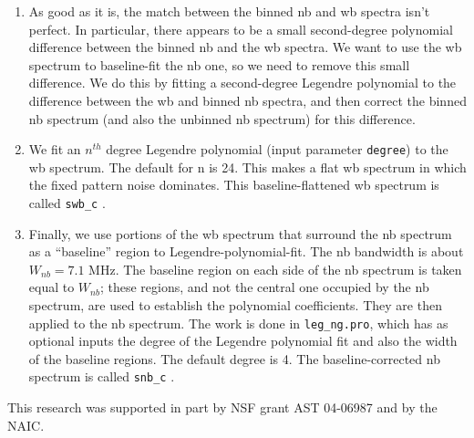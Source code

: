 \documentclass[psfig,preprint]{aastex}
\begin{document}
\begin{enumerate}
	\item As good as it is, the match between the binned nb and wb
spectra isn't perfect.  In particular, there appears to be a small
second-degree polynomial difference between the binned nb and the wb
spectra.  We want to use the wb spectrum to baseline-fit the nb one, so
we need to remove this small difference.  We do this by fitting a
second-degree Legendre polynomial to the difference between the wb and
binned nb spectra, and then correct the binned nb spectrum (and also the
unbinned nb spectrum) for this difference. 

	\item We fit an $n^{th}$ degree Legendre polynomial (input parameter
\verb$degree$) to the wb spectrum. The default for n is 24. This makes a
flat wb spectrum in which the fixed pattern noise dominates. This
baseline-flattened wb spectrum is called \verb$swb_c$ .

	\item Finally, we use portions of the wb spectrum that surround
the nb spectrum as a ``baseline'' region to Legendre-polynomial-fit. The
nb bandwidth is about $W_{nb}= 7.1$ MHz. The baseline region on each
side of the nb spectrum is taken equal to $W_{nb}$; these regions, and
not the central one occupied by the nb spectrum, are used to establish
the polynomial coefficients. They are then applied to the nb spectrum.
The work is done in \verb$leg_ng.pro$, which has as optional inputs the
degree of the Legendre polynomial fit and also the width of the baseline
regions. The default degree is 4. The baseline-corrected nb spectrum is
called \verb$snb_c$ .

\end{enumerate}

\acknowledgements

        This research was supported in part by NSF grant AST 04-06987    
and by the NAIC.
\end{document}
